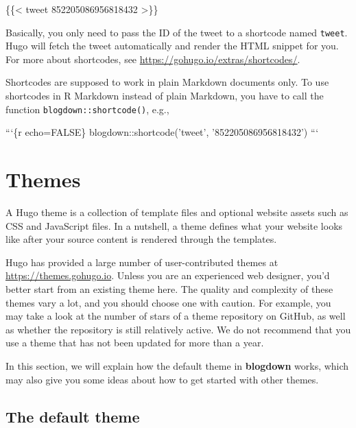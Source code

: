\documentclass[12pt,]{krantz}
\makeatletter
\newenvironment{Shaded}{\begin{snugshade}}{\end{snugshade}}
\newcommand{\DecValTok}[1]{\textcolor[rgb]{0.00,0.00,0.81}{#1}}
\newcommand{\NormalTok}[1]{#1}
\newenvironment{kframe}{%
\medskip{}
\setlength{\fboxsep}{.8em}
 \def\at@end@of@kframe{}%
 \ifinner\ifhmode%
  \def\at@end@of@kframe{\end{minipage}}%
  \begin{minipage}{\columnwidth}%
 \fi\fi%
 \def\FrameCommand##1{\hskip\@totalleftmargin \hskip-\fboxsep
 \colorbox{shadecolor}{##1}\hskip-\fboxsep
     \hskip-\linewidth \hskip-\@totalleftmargin \hskip\columnwidth}%
 \MakeFramed {\advance\hsize-\width
   \@totalleftmargin\z@ \linewidth\hsize
   \@setminipage}}%
 {\par\unskip\endMakeFramed%
 \at@end@of@kframe}
\renewenvironment{Shaded}{\begin{kframe}}{\end{kframe}}
\theoremstyle{definition}
\theoremstyle{definition}
\theoremstyle{definition}
\theoremstyle{remark}
\makeatother
\begin{document}
\begin{Shaded}
\begin{Highlighting}[]
\NormalTok{\{\{< tweet }\DecValTok{852205086956818432}\NormalTok{ >\}\}}
\end{Highlighting}
\end{Shaded}

Basically, you only need to pass the ID of the tweet to a shortcode
named \texttt{tweet}. Hugo will fetch the tweet automatically and render
the HTML snippet for you. For more about shortcodes, see
\url{https://gohugo.io/extras/shortcodes/}.

Shortcodes are supposed to work in plain Markdown documents only. To use
shortcodes in R Markdown instead of plain Markdown, you have to call the
function \texttt{blogdown::shortcode()}, e.g.,

\begin{Shaded}
\begin{Highlighting}[]
\NormalTok{```\{r echo=FALSE\}}
\NormalTok{blogdown::shortcode('tweet', '852205086956818432')}
\NormalTok{```}
\end{Highlighting}
\end{Shaded}

\section{Themes}\label{themes}

A Hugo theme is a collection of template files and
optional website assets such as CSS and JavaScript files. In a nutshell,
a theme defines what your website looks like after your source content
is rendered through the templates.

Hugo has provided a large number of user-contributed themes at
\url{https://themes.gohugo.io}. Unless you are an experienced web
designer, you'd better start from an existing theme here. The quality
and complexity of these themes vary a lot, and you should choose one
with caution. For example, you may take a look at the number of stars of
a theme repository on GitHub, as well as whether the repository is still
relatively active. We do not recommend that you use a theme that has not
been updated for more than a year.

In this section, we will explain how the default theme in
\textbf{blogdown} works, which may also give you some ideas about how to
get started with other themes.

\subsection{The default theme}\label{the-default-theme}
\end{document}
